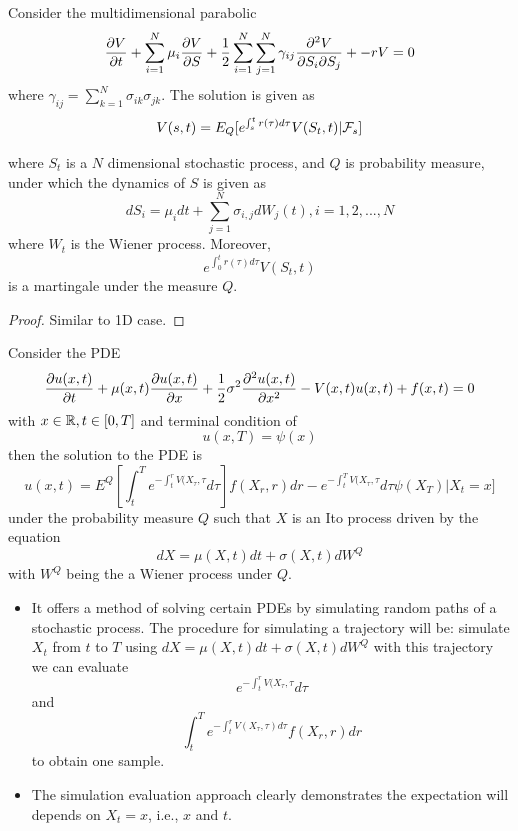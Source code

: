 \begin{refsection}
\begin{theorem}\label{ch:theory-of-stochastic-process:th:multiDFeymanKac}
	Consider the multidimensional parabolic 
	$$\frac{\partial V}{\partial t} + \sum_{i=1}^N \mu_i \frac{\partial V}{\partial S} + \frac{1}{2}\sum_{i=1}^N \sum_{j=1}^N \gamma_{ij} \frac{\partial^2 V}{\partial S_i\partial S_j} +  - rV = 0$$
	where $\gamma_{ij} = \sum_{k=1}^N \sigma_{ik}\sigma_{jk}$.
	The solution is given as
	$$V(s,t) = E_Q[e^{\int_s^t r(\tau) d\tau}V(S_t,t)|\mathcal{F}_s]$$
	
	where $S_t$ is a $N$ dimensional stochastic process, and $Q$ is probability measure, under which the dynamics of $S$ is given as
	$$dS_i = \mu_i dt + \sum_{j=1}^N \sigma_{i,j} dW_j(t), i=1,2,...,N $$ 
	where $W_t$ is the Wiener process.
	Moreover, $$e^{\int_0^t r(\tau) d\tau}V(S_t,t)$$
	is a martingale under the measure $Q$.
\end{theorem}
\begin{proof}
	Similar to 1D case.
\end{proof}



\begin{theorem}
	Consider the PDE
	$$\frac{\partial u(x,t)}{\partial t} +\mu(x,t) \frac{\partial u(x,t)}{\partial x} + \frac{1}{2}\sigma^2 \frac{\partial^2 u(x,t)}{\partial x^2} - V(x,t)u(x,t) + f(x,t) = 0$$
	with $x\in \mathbb{R},t\in [0,T]$ and terminal condition of $$u(x,T) = \psi(x)$$ then the solution to the PDE is
	$$u(x,t) = E^Q[\int_t^T e^{-\int_t^r V(X_\tau,\tau} d\tau] f(X_r,r)dr - e^{-\int_t^T V(X_{\tau},\tau} d\tau \psi(X_T) | X_t = x]$$
	under the probability measure $Q$ such that $X$ is an Ito process driven by the equation
	$$dX = \mu(X,t)dt + \sigma(X,t)dW^Q$$
	with $W^Q$ being the a Wiener process under $Q$. 
\end{theorem}



\begin{remark}\hfill
	\begin{itemize}
		\item It offers a method of solving certain PDEs by simulating random paths of a stochastic process. The procedure for simulating a trajectory will be:
		simulate $X_t$ from $t$ to $T$ using $dX = \mu(X,t)dt + \sigma(X,t)dW^Q$
		with this trajectory we can evaluate
		$$e^{-\int_t^r V(X_\tau,\tau} d\tau$$
		and 
		$$\int_t^T e^{-\int_t^r V(X_\tau,\tau) d\tau } f(X_r,r)dr$$
		to obtain one sample. 
		\item The simulation evaluation approach clearly demonstrates the expectation will depends on $X_t=x$, i.e., $x$ and $t$.
	\end{itemize}
\end{remark}



\end{refsection}
